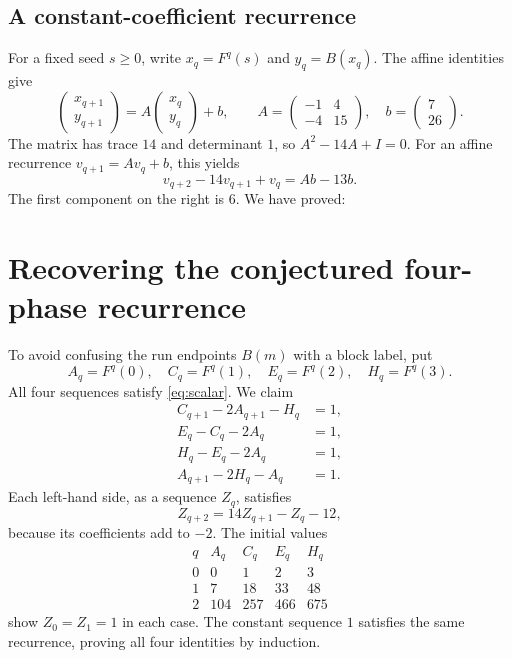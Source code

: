 \documentclass[11pt]{article}
\newtheorem{proposition}[theorem]{Proposition}
\theoremstyle{definition}
\numberwithin{equation}{section}
\begin{document}
\subsection{A constant-coefficient recurrence}
For a fixed seed $s\ge0$, write $x_q=F^q(s)$ and $y_q=B(x_q)$. The affine identities give
\begin{equation}\label{eq:matrix}
 \begin{pmatrix}x_{q+1}\\y_{q+1}\end{pmatrix}
 =A\begin{pmatrix}x_q\\y_q\end{pmatrix}+b,
 \qquad
 A=\begin{pmatrix}-1&4\\-4&15\end{pmatrix},\quad
 b=\begin{pmatrix}7\\26\end{pmatrix}.
\end{equation}
The matrix has trace $14$ and determinant $1$, so $A^2-14A+I=0$. For an affine recurrence $v_{q+1}=Av_q+b$, this yields
\[
 v_{q+2}-14v_{q+1}+v_q=Ab-13b.
\]
The first component on the right is $6$. We have proved:

\section{Recovering the conjectured four-phase recurrence}\label{sec:original}
To avoid confusing the run endpoints $B(m)$ with a block label, put
\[
 A_q=F^q(0),\quad C_q=F^q(1),\quad E_q=F^q(2),\quad H_q=F^q(3).
\]
All four sequences satisfy \eqref{eq:scalar}. We claim
\begin{align}
 C_{q+1}-2A_{q+1}-H_q&=1,\label{eq:res1}\\
 E_q-C_q-2A_q&=1,\label{eq:res2}\\
 H_q-E_q-2A_q&=1,\label{eq:res3}\\
 A_{q+1}-2H_q-A_q&=1.\label{eq:res4}
\end{align}
Each left-hand side, as a sequence $Z_q$, satisfies
\[
 Z_{q+2}=14Z_{q+1}-Z_q-12,
\]
because its coefficients add to $-2$. The initial values
\[
\begin{array}{c|rrrr}
q&A_q&C_q&E_q&H_q\\\hline
0&0&1&2&3\\
1&7&18&33&48\\
2&104&257&466&675
\end{array}
\]
show $Z_0=Z_1=1$ in each case. The constant sequence $1$ satisfies the same recurrence, proving all four identities by induction.
\end{document}
